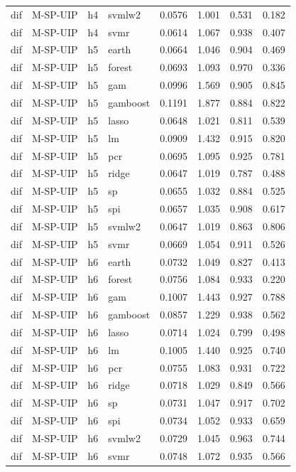 \begin{ThreePartTable}
\begin{longtable}[t]{llclcccc}
dif & M-SP-UIP & h4 & svmlw2 & 0.0576 & 1.001 & 0.531 & 0.182\\
dif & M-SP-UIP & h4 & svmr & 0.0614 & 1.067 & 0.938 & 0.407\\
\addlinespace
dif & M-SP-UIP & h5 & earth & 0.0664 & 1.046 & 0.904 & 0.469\\
dif & M-SP-UIP & h5 & forest & 0.0693 & 1.093 & 0.970 & 0.336\\
dif & M-SP-UIP & h5 & gam & 0.0996 & 1.569 & 0.905 & 0.845\\
dif & M-SP-UIP & h5 & gamboost & 0.1191 & 1.877 & 0.884 & 0.822\\
dif & M-SP-UIP & h5 & lasso & 0.0648 & 1.021 & 0.811 & 0.539\\
dif & M-SP-UIP & h5 & lm & 0.0909 & 1.432 & 0.915 & 0.820\\
dif & M-SP-UIP & h5 & pcr & 0.0695 & 1.095 & 0.925 & 0.781\\
dif & M-SP-UIP & h5 & ridge & 0.0647 & 1.019 & 0.787 & 0.488\\
dif & M-SP-UIP & h5 & sp & 0.0655 & 1.032 & 0.884 & 0.525\\
dif & M-SP-UIP & h5 & spi & 0.0657 & 1.035 & 0.908 & 0.617\\
dif & M-SP-UIP & h5 & svmlw2 & 0.0647 & 1.019 & 0.863 & 0.806\\
dif & M-SP-UIP & h5 & svmr & 0.0669 & 1.054 & 0.911 & 0.526\\
\addlinespace
dif & M-SP-UIP & h6 & earth & 0.0732 & 1.049 & 0.827 & 0.413\\
dif & M-SP-UIP & h6 & forest & 0.0756 & 1.084 & 0.933 & 0.220\\
dif & M-SP-UIP & h6 & gam & 0.1007 & 1.443 & 0.927 & 0.788\\
dif & M-SP-UIP & h6 & gamboost & 0.0857 & 1.229 & 0.938 & 0.562\\
dif & M-SP-UIP & h6 & lasso & 0.0714 & 1.024 & 0.799 & 0.498\\
dif & M-SP-UIP & h6 & lm & 0.1005 & 1.440 & 0.925 & 0.740\\
dif & M-SP-UIP & h6 & pcr & 0.0755 & 1.083 & 0.931 & 0.722\\
dif & M-SP-UIP & h6 & ridge & 0.0718 & 1.029 & 0.849 & 0.566\\
dif & M-SP-UIP & h6 & sp & 0.0731 & 1.047 & 0.917 & 0.702\\
dif & M-SP-UIP & h6 & spi & 0.0734 & 1.052 & 0.933 & 0.659\\
dif & M-SP-UIP & h6 & svmlw2 & 0.0729 & 1.045 & 0.963 & 0.744\\
dif & M-SP-UIP & h6 & svmr & 0.0748 & 1.072 & 0.935 & 0.566\\

\end{longtable}
\end{ThreePartTable}
